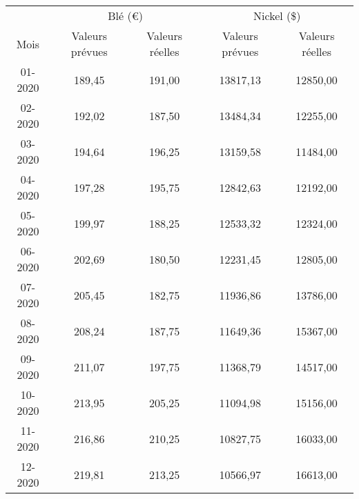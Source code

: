 
\begin{tabular}{ccccc}
\toprule
& \multicolumn{2}{c}{Blé (\euro)} & \multicolumn{2}{c}{Nickel (\$)} \\
 Mois  & Valeurs prévues & Valeurs réelles & Valeurs prévues & Valeurs réelles \\
\cmidrule(r){1-1}\cmidrule(lr){2-3}\cmidrule(lr){4-5}
01-2020 & 189,45 & 191,00 & 13817,13 & 12850,00 \\
02-2020 & 192,02 & 187,50 & 13484,34 & 12255,00 \\
03-2020 & 194,64 & 196,25 & 13159,58 & 11484,00 \\
04-2020 & 197,28 & 195,75 & 12842,63 & 12192,00 \\
05-2020 & 199,97 & 188,25 & 12533,32 & 12324,00 \\
06-2020 & 202,69 & 180,50 & 12231,45 & 12805,00 \\
07-2020 & 205,45 & 182,75 & 11936,86 & 13786,00 \\
08-2020 & 208,24 & 187,75 & 11649,36 & 15367,00 \\
09-2020 & 211,07 & 197,75 & 11368,79 & 14517,00 \\
10-2020 & 213,95 & 205,25 & 11094,98 & 15156,00 \\
11-2020 & 216,86 & 210,25 & 10827,75 & 16033,00 \\
12-2020 & 219,81 & 213,25 & 10566,97 & 16613,00 \\
\bottomrule
\end{tabular}%

